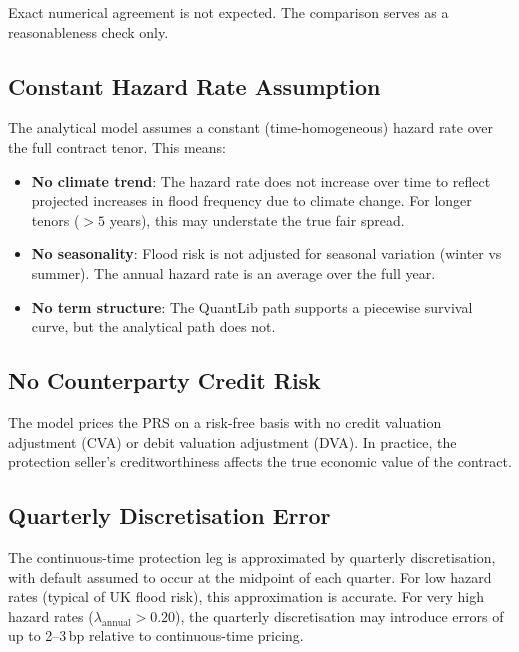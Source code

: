 \documentclass[11pt,a4paper]{article}
\begin{document}
Exact numerical agreement is not expected. The comparison serves as a reasonableness
check only.


\mkmlimitations

\subsection{Constant Hazard Rate Assumption}

The analytical model assumes a constant (time-homogeneous) hazard rate over the full
contract tenor. This means:

\begin{itemize}[nosep]
    \item \textbf{No climate trend}: The hazard rate does not increase over time to
          reflect projected increases in flood frequency due to climate change. For
          longer tenors ($>5$ years), this may understate the true fair spread.
    \item \textbf{No seasonality}: Flood risk is not adjusted for seasonal variation
          (winter vs summer). The annual hazard rate is an average over the full year.
    \item \textbf{No term structure}: The QuantLib path supports a piecewise survival
          curve, but the analytical path does not.
\end{itemize}

\subsection{No Counterparty Credit Risk}

The model prices the PRS on a risk-free basis with no credit valuation adjustment
(CVA) or debit valuation adjustment (DVA). In practice, the protection seller's
creditworthiness affects the true economic value of the contract.

\subsection{Quarterly Discretisation Error}

The continuous-time protection leg is approximated by quarterly discretisation, with
default assumed to occur at the midpoint of each quarter. For low hazard rates (typical
of UK flood risk), this approximation is accurate. For very high hazard rates
($\lambda_{\text{annual}} > 0.20$), the quarterly discretisation may introduce errors
of up to 2--3\,bp relative to continuous-time pricing.
\end{document}
